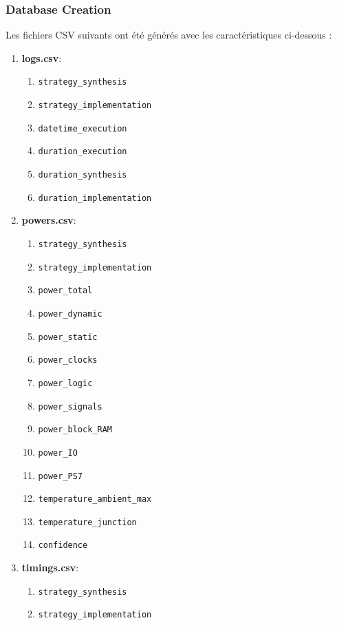 \documentclass[../CSC_5RO07_TA.tex]{subfiles}
\begin{document}
\subsubsection{Database Creation}
\noindent Les fichiers CSV suivants ont été générés avec les caractéristiques ci-dessous :
\begin{enumerate}
    \item \textbf{logs.csv}:
    \begin{enumerate}[noitemsep]
        \item \texttt{strategy\_synthesis}
        \item \texttt{strategy\_implementation}
        \item \texttt{datetime\_execution}
        \item \texttt{duration\_execution}
        \item \texttt{duration\_synthesis}
        \item \texttt{duration\_implementation}
    \end{enumerate}
    \item \textbf{powers.csv}:
    \begin{enumerate}[noitemsep]
        \item \texttt{strategy\_synthesis}
        \item \texttt{strategy\_implementation}
        \item \texttt{power\_total}
        \item \texttt{power\_dynamic}
        \item \texttt{power\_static}
        \item \texttt{power\_clocks}
        \item \texttt{power\_logic}
        \item \texttt{power\_signals}
        \item \texttt{power\_block\_RAM}
        \item \texttt{power\_IO}
        \item \texttt{power\_PS7}
        \item \texttt{temperature\_ambient\_max}
        \item \texttt{temperature\_junction}
        \item \texttt{confidence}
    \end{enumerate}
    \item \textbf{timings.csv}:
    \begin{enumerate}[noitemsep]
        \item \texttt{strategy\_synthesis}
        \item \texttt{strategy\_implementation}

\end{enumerate}
\end{enumerate}
\end{document}
